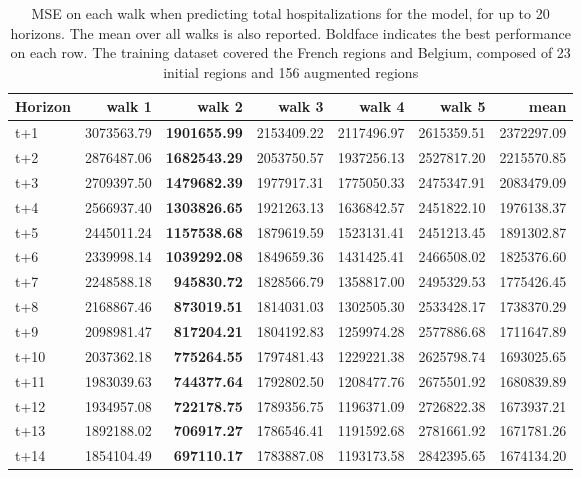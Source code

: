 \begin{table}[H]
\centering
\caption{MSE on each walk when predicting total hospitalizations for the model, for up to 20 horizons. The mean over all walks is also reported. Boldface indicates the best performance on each row. The training dataset covered the French regions and Belgium, composed of 23 initial regions and 156 augmented regions }
\label{tab:MSE_walk_encoder_decoder}
\begin{tabular}{lrrrrrr}
\toprule
Horizon &     walk 1 &     walk 2 &     walk 3 &     walk 4 &     walk 5 &       mean \\
\midrule
t+1  & 3073563.79  & \textbf{1901655.99}  & 2153409.22  & 2117496.97  & 2615359.51  & 2372297.09  \\
t+2  & 2876487.06  & \textbf{1682543.29}  & 2053750.57  & 1937256.13  & 2527817.20  & 2215570.85  \\
t+3  & 2709397.50  & \textbf{1479682.39}  & 1977917.31  & 1775050.33  & 2475347.91  & 2083479.09  \\
t+4  & 2566937.40  & \textbf{1303826.65}  & 1921263.13  & 1636842.57  & 2451822.10  & 1976138.37  \\
t+5  & 2445011.24  & \textbf{1157538.68}  & 1879619.59  & 1523131.41  & 2451213.45  & 1891302.87  \\
t+6  & 2339998.14  & \textbf{1039292.08}  & 1849659.36  & 1431425.41  & 2466508.02  & 1825376.60  \\
t+7  & 2248588.18  & \textbf{945830.72}  & 1828566.79  & 1358817.00  & 2495329.53  & 1775426.45  \\
t+8  & 2168867.46  & \textbf{873019.51}  & 1814031.03  & 1302505.30  & 2533428.17  & 1738370.29  \\
t+9  & 2098981.47  & \textbf{817204.21}  & 1804192.83  & 1259974.28  & 2577886.68  & 1711647.89  \\
t+10  & 2037362.18  & \textbf{775264.55}  & 1797481.43  & 1229221.38  & 2625798.74  & 1693025.65  \\
t+11  & 1983039.63  & \textbf{744377.64}  & 1792802.50  & 1208477.76  & 2675501.92  & 1680839.89  \\
t+12  & 1934957.08  & \textbf{722178.75}  & 1789356.75  & 1196371.09  & 2726822.38  & 1673937.21  \\
t+13  & 1892188.02  & \textbf{706917.27}  & 1786546.41  & 1191592.68  & 2781661.92  & 1671781.26  \\
t+14  & 1854104.49  & \textbf{697110.17}  & 1783887.08  & 1193173.58  & 2842395.65  & 1674134.20  \\

\end{tabular}
\end{table}
